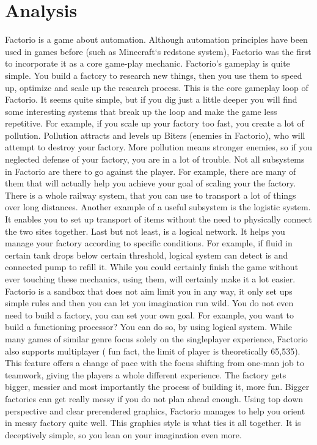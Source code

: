 \documentclass[a4paper,10pt,english]{article}
\begin{document}
\section*{\centering Analysis}
Factorio is a game about automation. Although automation principles have been used in games before (such as Minecraft`s redstone system), Factorio was the first to incorporate it as a core game-play mechanic. 
\newline
\newline
Factorio's gameplay is quite simple. You build a factory to research new things, then you use them to speed up, optimize and scale up the research process. This is the core gameplay loop of Factorio. It seems quite simple, but if you dig just a little deeper you will find some interesting systems that break up the loop and make the game less repetitive. For example, if you scale up your factory too fast, you create a lot of pollution. Pollution attracts and levels up Biters (enemies in Factorio), who will attempt to destroy your factory. More pollution means stronger enemies, so if you neglected defense of your factory, you are in a lot of trouble. 
\newline
\newline
Not all subsystems in Factorio are there to go against the player. For example, there are many of them that will actually help you achieve your goal of scaling your the factory. There is a whole railway system, that you can use to transport a lot of things over long distances. Another example of a useful subsystem is the logistic system. It enables you to set up transport of items without the need to physically connect the two sites together. Last but not least, is a logical network. It helps you manage your factory according to specific conditions. For example, if fluid in certain tank drops below certain threshold, logical system can detect is and connected pump to refill it. While you could certainly finish the game without ever touching these mechanics, using them, will certainly make it a lot easier. 
\newline
\newline
Factorio is a sandbox that does not aim limit you in any way, it only set ups simple rules and then you can let you imagination run wild. You do not even need to build a factory, you can set your own goal. For example, you want to build a functioning processor? You can do so, by using logical system. 
\newline
\newline
While many games of similar genre focus solely on the singleplayer experience, Factorio also supports multiplayer ( fun fact, the limit of player is theoretically 65,535). This feature offers a change of pace with the focus shifting from one-man job to teamwork, giving the players a whole different experience. The factory gets bigger, messier and most importantly the process of building it, more fun.
\newline
\newline
Bigger factories can get really messy if you do not plan ahead enough. Using top down perspective and clear prerendered graphics, Factorio manages to help you orient in messy factory quite well. This graphics style is what ties it all together. It is deceptively simple, so you lean on your imagination even more. 
\end{document}
